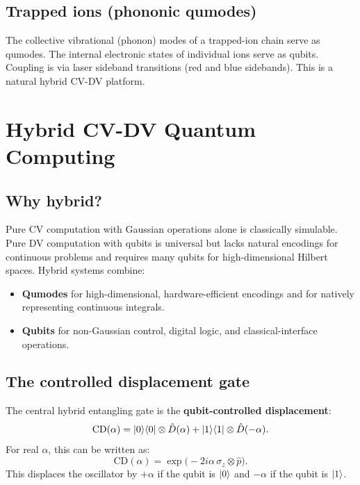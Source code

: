 \documentclass[11pt]{article}
\newcommand{\ph}{\hat{p}}
\newcommand{\Dop}{\hat{D}}
\begin{document}
\subsection{Trapped ions (phononic qumodes)}

The collective vibrational (phonon) modes of a trapped-ion chain serve as
qumodes.  The internal electronic states of individual ions serve as
qubits.  Coupling is via laser sideband transitions (red and blue
sidebands).  This is a natural hybrid CV-DV platform.

\section{Hybrid CV-DV Quantum Computing}
\label{sec:hybrid}

\subsection{Why hybrid?}

Pure CV computation with Gaussian operations alone is classically
simulable.
Pure DV computation with qubits is universal but lacks natural encodings
for continuous problems and requires many qubits for high-dimensional
Hilbert spaces.
Hybrid systems combine:
\begin{itemize}[nosep]
\item \textbf{Qumodes} for high-dimensional, hardware-efficient encodings
  and for natively representing continuous integrals.
\item \textbf{Qubits} for non-Gaussian control, digital logic, and
  classical-interface operations.
\end{itemize}

\subsection{The controlled displacement gate}

The central hybrid entangling gate is the \textbf{qubit-controlled
displacement}:
\begin{equation}\label{eq:cd-gate}
\mathrm{CD}(\alpha) = \ket{0}\!\bra{0} \otimes \Dop(\alpha)
  + \ket{1}\!\bra{1} \otimes \Dop(-\alpha).
\end{equation}
For real $\alpha$, this can be written as:
\begin{equation}
\mathrm{CD}(\alpha) = \exp\!\big(-2i\alpha\, \sigma_z \otimes \ph\big).
\end{equation}
This displaces the oscillator by $+\alpha$ if the qubit is $\ket{0}$ and
$-\alpha$ if the qubit is $\ket{1}$.
\end{document}
